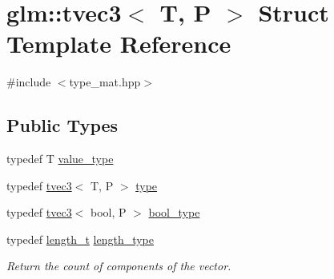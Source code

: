 \hypertarget{structglm_1_1tvec3}{}\section{glm\+::tvec3$<$ T, P $>$ Struct Template Reference}
\label{structglm_1_1tvec3}


{\ttfamily \#include $<$type\+\_\+mat.\+hpp$>$}

\subsection*{Public Types}
\begin{DoxyCompactItemize}
\item 
typedef T \mbox{\hyperlink{structglm_1_1tvec3_a9831435e7980f26529de581ad8fed6f0}{value\+\_\+type}}
\item 
typedef \mbox{\hyperlink{structglm_1_1tvec3}{tvec3}}$<$ T, P $>$ \mbox{\hyperlink{structglm_1_1tvec3_ac2fe9ecb34ed8919d08879311ec74b8a}{type}}
\item 
typedef \mbox{\hyperlink{structglm_1_1tvec3}{tvec3}}$<$ bool, P $>$ \mbox{\hyperlink{structglm_1_1tvec3_a7d83af99df8b5a51688967cd08789917}{bool\+\_\+type}}
\item 
typedef \mbox{\hyperlink{namespaceglm_a090a0de2260835bee80e71a702492ed9}{length\+\_\+t}} \mbox{\hyperlink{structglm_1_1tvec3_a3a79c6a1cfc9fb8821a0a878fa2de91a}{length\+\_\+type}}
\begin{DoxyCompactList}\small\item\em Return the count of components of the vector. \end{DoxyCompactList}\end{DoxyCompactItemize}
